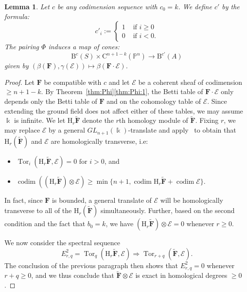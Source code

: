 \documentclass[12pt]{amsart}
\newtheorem{lemma}{Lemma}[section]
\theoremstyle{definition}
\theoremstyle{remark}
\newcommand{\Tor}{\operatorname{Tor}}
\newcommand{\kk}{\Bbbk}
\newcommand{\codim}{\operatorname{codim}}
\newcommand{\PP}{\mathbb{P}}
\newcommand{\HH}{\mathrm{H}}
\newcommand{\cc}{c}
\newcommand{\cE}{\mathcal{E}}
\newcommand{\FF}{\mathbf{F}}
\newcommand{\GL}{{GL}}
\newcommand{\CQ}{\mathrm{C}}
\newcommand{\BBQ}{\mathrm{B}}
\begin{document}
\begin{lemma}\label{lem:refined positivity}
Let $\cc$ be any codimension sequence with $\cc_0=k$.   We define $\cc'$ by the formula:
\[
\cc'_i:=\begin{cases}
1&\text{ if } i\geq 0\\%
0&\text{ if } i<0. %
\end{cases}
\]
The  pairing $\Phi$ induces a map of cones:
\[
\BBQ^{\cc}(S)\times \CQ^{n+1-k}(\PP^n)\to \BBQ^{\cc'}(A)
\]
given by $(\beta(\FF), \gamma(\cE))\mapsto \beta(\FF\cdot \cE)$.
\end{lemma}
\begin{proof}
Let $\FF$ be compatible with $\cc$ and let $\cE$ be a coherent sheaf of codimension $\geq n+1-k$.  By Theorem~\ref{thm:Phi}\eqref{thm:Phi:1}, the Betti table of $\FF\cdot \cE$ only depends only the Betti table of $\FF$ and on the cohomology table of $\cE$.  Since extending the ground field does not affect either of these tables, we may assume $\kk$ is infinite.  We let $\HH_r \widetilde{\FF}$ denote the $r$th homology module of $\widetilde{\FF}$.  Fixing $r$, we may replace $\cE$ by a general $\GL_{n+1}(\kk)$-translate and apply~\cite[Theorem, p.\ 335]{miller-speyer} to obtain that $\HH_r(\widetilde{\FF})$ and $\cE$ are homologically transverse, i.e:
\begin{itemize}
	\item $\Tor_i(\HH_r\widetilde{\FF},\cE)=0 \text{ for } i>0$, and
	\item $\codim ((\HH_r\widetilde{\FF})\otimes \cE) \geq \min\{n+1, \codim \HH_r\widetilde{\FF}+\codim \cE\}.$
\end{itemize}
In fact, since $\FF$ is bounded, a general translate of $\cE$ will be homologically transverse to all of the $\HH_r(\widetilde{\FF})$ simultaneously.  Further, based on the second condition and the fact that $b_0=k$, we have $(\HH_r\widetilde{\FF})\otimes \cE=0$ whenever $r\geq 0$.


We now consider the spectral sequence
\[
E^2_{r,q}=\Tor_q(\HH_r\widetilde{\FF},\cE)\Rightarrow \Tor_{r+q}(\widetilde{\FF},\cE).
\]
The conclusion of the previous paragraph then shows that $E^2_{r,q}=0$ whenever $r+q\geq 0$, and we thus conclude that 
$\widetilde{\FF}\otimes \cE$ is exact in homological degrees $\geq 0$.


\end{proof}
\end{document}
